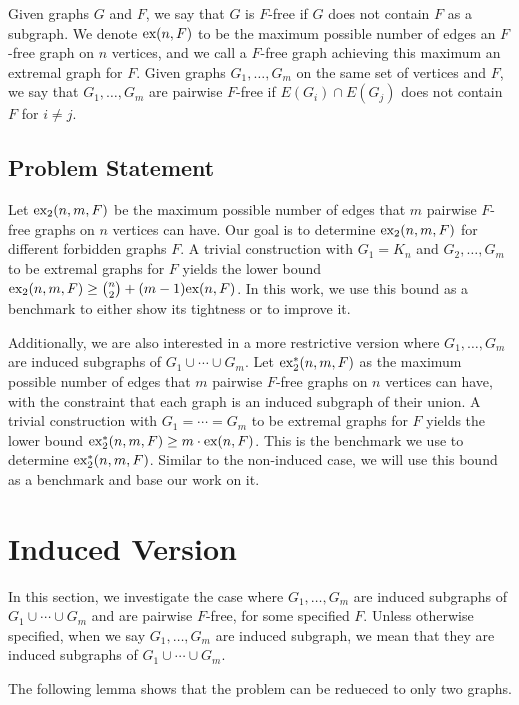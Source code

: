 \documentclass[12pt]{report}
\newcommand*{\ex}{\textnormal{ex}}
\newcommand*{\dex}{\textnormal{ex}_2}
\begin{document}
Given graphs $G$ and $F$, we say that $G$ is $F$-free if $G$ does not contain $F$ as a subgraph. We denote $\ex(n, F)$ to be the maximum  possible number of edges an $F$-free graph on $n$ vertices, and we call a $F$-free graph achieving this maximum an extremal graph for $F$. Given graphs $G_1, \ldots, G_m$ on the same set of vertices and $F$, we say that $G_1, \ldots, G_m$ are pairwise $F$-free if $E(G_i) \cap E(G_j)$ does not contain $F$ for $i \neq j$.

\section{Problem Statement}

Let $\dex(n, m, F)$ be the maximum possible number of edges that $m$ pairwise $F$-free graphs on $n$ vertices can have. Our goal is to determine $\dex(n, m, F)$ for different forbidden graphs $F$. A trivial construction with $G_1 = K_n$ and $G_2, \ldots, G_m$ to be extremal graphs for $F$ yields the lower bound $\dex(n, m, F) \geq \binom{n}{2} + (m - 1)\ex(n, F)$. In this work, we use this bound as a benchmark to either show its tightness or to improve it.

Additionally, we are also interested in a more restrictive version where $G_1, \ldots, G_m$ are induced subgraphs of $G_1 \cup \cdots \cup G_m$. Let $\dex^*(n, m, F)$ as the maximum possible number of edges that $m$ pairwise $F$-free graphs on $n$ vertices can have, with the constraint that each graph is an induced subgraph of their union. A trivial construction with $G_1 = \cdots = G_m$ to be extremal graphs for $F$ yields the lower bound $\dex^*(n, m, F) \geq m \cdot \ex(n, F)$. This is the benchmark we use to determine $\dex^*(n, m, F)$. Similar to the non-induced case, we will use this bound as a benchmark and base our work on it.

\chapter{Induced Version}

In this section, we investigate the case where $G_1, \ldots, G_m$ are induced subgraphs of $G_1 \cup \cdots \cup G_m$ and are pairwise $F$-free, for some specified $F$. Unless otherwise specified, when we say $G_1, \ldots, G_m$ are induced subgraph, we mean that they are induced subgraphs of $G_1 \cup \cdots \cup G_m$.

The following lemma shows that the problem can be redueced to only two graphs.
\end{document}
